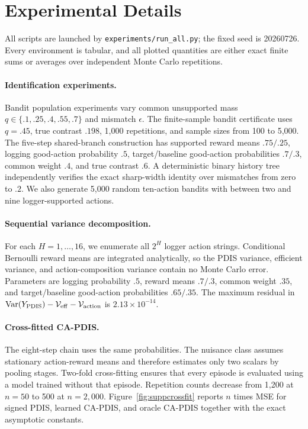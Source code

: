 \section{Experimental Details}

All scripts are launched by \texttt{experiments/run\_all.py}; the fixed seed is 20260726. Every environment is tabular, and all plotted quantities are either exact finite sums or averages over independent Monte Carlo repetitions.

\paragraph{Identification experiments.}
Bandit population experiments vary common unsupported mass
$q\in\{.1,.25,.4,.55,.7\}$ and mismatch $\epsilon$. The finite-sample bandit certificate uses $q=.45$, true contrast $.198$, 1,000 repetitions, and sample sizes from 100 to 5,000. The five-step shared-branch construction has supported reward means $.75/.25$, logging good-action probability $.5$, target/baseline good-action probabilities $.7/.3$, common weight $.4$, and true contrast $.6$. A deterministic binary history tree independently verifies the exact sharp-width identity over mismatches from zero to $.2$. We also generate 5,000 random ten-action bandits with between two and nine logger-supported actions.

\paragraph{Sequential variance decomposition.}
For each $H=1,\ldots,16$, we enumerate all $2^H$ logger action strings. Conditional Bernoulli reward means are integrated analytically, so the PDIS variance, efficient variance, and action-composition variance contain no Monte Carlo error. Parameters are logging probability $.5$, reward means $.7/.3$, common weight $.35$, and target/baseline good-action probabilities $.65/.35$. The maximum residual in
$\operatorname{Var}(Y_{\rm PDIS})-\mathcal V_{\rm eff}-\mathcal V_{\rm action}$
is $2.13\times10^{-14}$.

\paragraph{Cross-fitted CA-PDIS.}
The eight-step chain uses the same probabilities. The nuisance class assumes stationary action-reward means and therefore estimates only two scalars by pooling stages. Two-fold cross-fitting ensures that every episode is evaluated using a model trained without that episode. Repetition counts decrease from 1,200 at $n=50$ to 500 at $n=2{,}000$. Figure~\ref{fig:suppcrossfit} reports $n$ times MSE for signed PDIS, learned CA-PDIS, and oracle CA-PDIS together with the exact asymptotic constants.

